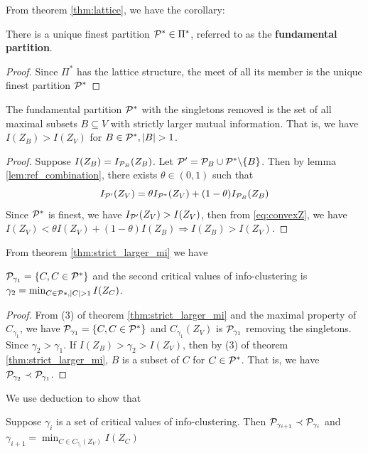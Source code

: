 \documentclass{article}
\begin{document}
From theorem \ref{thm:lattice}, we have the corollary:
\begin{corollary}
There is a unique finest partition $\P^* \in \Pi^*$, referred to as the \textbf{fundamental partition}.
\end{corollary}
\begin{proof}
Since $\Pi^*$ has the lattice structure, the meet of all its member is the unique finest partition $\P^*$
\end{proof}
\begin{theorem}\label{thm:strict_larger_mi}
The fundamental partition $\P^*$ with the singletons removed is the set of all maximal subsets $B \subseteq V$ with strictly larger mutual information. 
That is, we have
$I(Z_B) > I(Z_V)$ for $B \in \P^*, \abs{B}>1$.
\end{theorem}
\begin{proof}
Suppose $I(Z_B)=I_{\P_B}(Z_B)$.
Let $\P' = \P_B \cup  \P^* \backslash \{B\}$.
Then by lemma \ref{lem:ref_combination}, there exists $\theta \in (0,1)$ such that 
\begin{equation}\label{eq:convexZ}
I_{\P'}(Z_V) = \theta I_{\P^*}(Z_V) + (1-\theta) I_{\P_B}(Z_B)
\end{equation}
Since $\P^*$ is finest, we have $I_{\P'}(Z_V) > I(Z_V)$, then from \eqref{eq:convexZ}, we have 
$I(Z_V) < \theta I(Z_V) + (1-\theta) I(Z_B) \Rightarrow I(Z_B) > I(Z_V)$.

\end{proof}

From theorem \ref{thm:strict_larger_mi} we have 
\begin{theorem}
$\P_{\gamma_1} = \{C, C\in \P^* \}$ and
the second critical values of info-clustering is $\gamma_2 = \min_{C\in \P*, \abs{C}>1} I(Z_C)$.
\end{theorem}
\begin{proof}
From (3) of theorem \ref{thm:strict_larger_mi} and the maximal property of $C_{\gamma_1}$,
we have $\P_{\gamma_1} = \{C, C\in \P^* \}$ and $C_{\gamma_1}(Z_V)$ is $\P_{\gamma_1}$ removing the singletons.
Since $\gamma_2 > \gamma_1$. If $I(Z_B)>\gamma_2 > I(Z_V)$, then by (3) of theorem \ref{thm:strict_larger_mi}, $B$ is a subset of $C$ for $C \in \P^*$. That is, we have $\P_{\gamma_2} \prec \P_{\gamma_1}$. 
\end{proof}
We use deduction to show that
\begin{theorem}
Suppose $\gamma_i$ is a set of critical values of info-clustering. Then
$\P_{\gamma_{i+1}} \prec \P_{\gamma_i}$ and $\gamma_{i+1} = \min_{C \in C_{\gamma_i}(Z_V)}I(Z_C)$
\end{theorem}
\end{document}
